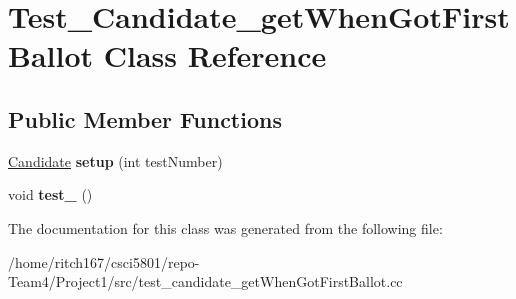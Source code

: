 \hypertarget{classTest__Candidate__getWhenGotFirstBallot}{}\section{Test\+\_\+\+Candidate\+\_\+get\+When\+Got\+First\+Ballot Class Reference}
\label{classTest__Candidate__getWhenGotFirstBallot}
\subsection*{Public Member Functions}
\begin{DoxyCompactItemize}
\item 
\mbox{\label{classTest__Candidate__getWhenGotFirstBallot_aa3e3b6c567033eabf40d64ce4ba57108}} 
\hyperlink{classCandidate}{Candidate} {\bfseries setup} (int test\+Number)
\item 
\mbox{\label{classTest__Candidate__getWhenGotFirstBallot_a1ec2c8904de526a36684f97fa7f274ce}} 
void {\bfseries test\+\_} ()
\end{DoxyCompactItemize}


The documentation for this class was generated from the following file\+:\begin{DoxyCompactItemize}
\item 
/home/ritch167/csci5801/repo-\/\+Team4/\+Project1/src/test\+\_\+candidate\+\_\+get\+When\+Got\+First\+Ballot.\+cc\end{DoxyCompactItemize}
